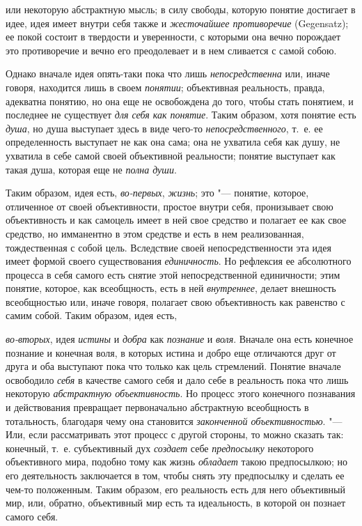 или некоторую абстрактную мысль; в силу свободы, которую
понятие достигает в идее, идея имеет внутри себя также и
{\em жесточайшее противоречие}
(Gegensatz); ее покой состоит в твердости и уверенности, с
которыми она вечно порождает это противоречие и вечно его преодолевает и в
нем сливается с самой собою.

Однако вначале идея опять-таки пока что лишь
{\em непосредственна}
или, иначе говоря, находится лишь в своем
{\em понятии};
объективная реальность, правда, адекватна понятию, но она еще
не освобождена до того, чтобы стать понятием, и последнее не существует
{\em для себя как понятие}.
Таким образом, хотя понятие есть
{\em душа}, но душа
выступает здесь в виде чего-то
{\em непосредственного},
т.~е. ее определенность выступает не как она сама; она не
ухватила себя как душу, не ухватила в себе самой своей объективной
реальности; понятие выступает как такая душа, которая еще не
{\em полна души}.

Таким образом, идея есть,
{\em во-первых},
{\em жизнь}; это
"--- понятие, которое, отличенное от своей объективности,
простое внутри себя, пронизывает свою объективность и как самоцель имеет в
ней свое средство и полагает ее как свое средство, но имманентно в этом
средстве и есть в нем реализованная, тождественная с собой цель. Вследствие
своей непосредственности эта идея имеет формой своего существования
{\em единичность}. Но
рефлексия ее абсолютного процесса в себя самого есть снятие этой
непосредственной единичности; этим понятие, которое, как всеобщность, есть
в ней {\em внутреннее},
делает внешность всеобщностью или, иначе говоря, полагает
свою объективность как равенство с самим собой. Таким образом, идея есть,

{\em во-вторых}, идея
{\em истины} и
{\em добра} как
{\em познание} и
{\em воля}. Вначале она
есть конечное познание и конечная воля, в которых истина и добро еще
отличаются друг от друга и оба выступают пока что только как цель
стремлений. Понятие вначале освободило
{\em себя} в качестве
самого себя и дало себе в реальность пока что лишь некоторую
{\em абстрактную объективность}.
Но процесс этого конечного познавания и действования
превращает первоначально абстрактную всеобщность в тотальность, благодаря
чему она становится {\em законченной
объективностью}. "--- Или, если рассматривать этот процесс с
другой стороны, то можно сказать так: конечный, т.~е. субъективный дух
{\em создает} себе
{\em предпосылку}
некоторого объективного мира, подобно тому как жизнь
{\em обладает} такою
предпосылкою; но его деятельность заключается в том, чтобы
снять эту предпосылку и сделать ее чем-то положенным. Таким образом, его
реальность есть для него объективный мир, или, обратно, объективный мир
есть та идеальность, в которой он познает самого себя.

